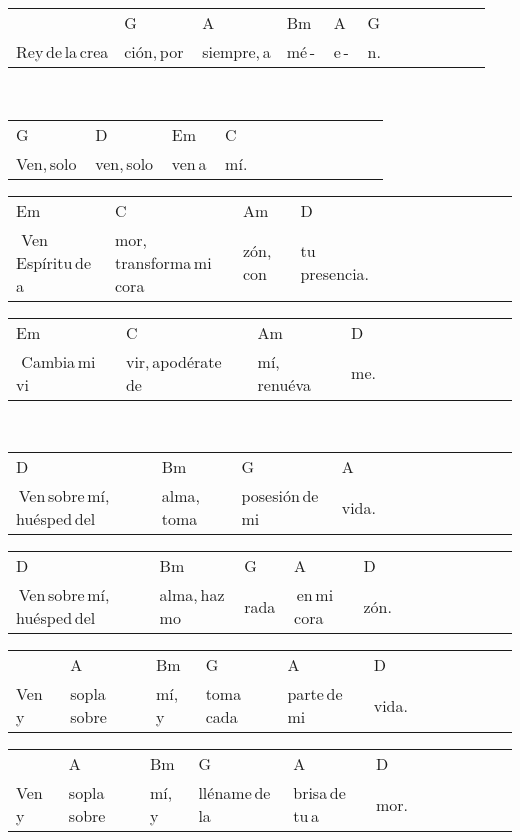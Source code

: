 \begin{multicols}{2}
\begin{minipage}{\columnwidth}
\noindent
\begin{tabular}{llllllllllll}
&G&A&Bm&A&G\\
Rey\,de\,la\,crea&ción,\,por\,&siempre,\,a&mé\,-\,&e\,-\,&n.
\end{tabular}
\end{minipage}\\

\noindent
\begin{minipage}{\columnwidth}
\noindent
\noindent
\begin{tabular}{llllllllllll}
G&D&Em&C\\
Ven,\,solo\,&ven,\,solo\,&ven\,a\,&mí.
\end{tabular}

\noindent
\begin{tabular}{llllllllllll}
Em&C&Am&D\\
\,\,Ven\,Espíritu\,de\,a&mor,\,transforma\,mi\,cora&zón,\,con\,&tu\,presencia.
\end{tabular}

\noindent
\begin{tabular}{llllllllllll}
Em&C&Am&D\\
\,\,Cambia\,mi\,vi&vir,\,apodérate\,de\,&mí,\,renuéva&me.
\end{tabular}
\end{minipage}\\

\noindent
\begin{minipage}{\columnwidth}
\noindent
\noindent
\begin{tabular}{llllllllllll}
D&Bm&G&A\\
\,Ven\,sobre\,mí,\,huésped\,del\,&alma,\,toma\,&posesión\,de\,mi\,&vida.
\end{tabular}

\noindent
\begin{tabular}{llllllllllll}
D&Bm&G&A&D\\
\,Ven\,sobre\,mí,\,huésped\,del\,&alma,\,haz\,mo&rada\,&\,en\,mi\,cora&zón.
\end{tabular}

\noindent
\begin{tabular}{llllllllllll}
&A&Bm&G&A&D\\
Ven\,y\,&sopla\,sobre\,&mí,\,y\,&toma\,cada\,&parte\,de\,mi\,&vida.
\end{tabular}

\noindent
\begin{tabular}{llllllllllll}
&A&Bm&G&A&D\\
Ven\,y\,&sopla\,sobre\,&mí,\,y\,&lléname\,de\,la\,&brisa\,de\,tu\,a&mor.
\end{tabular}
\end{minipage}\\

\end{multicols}